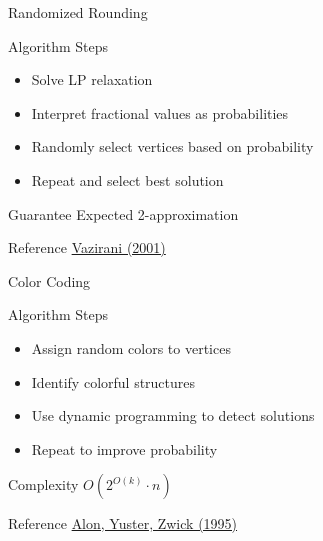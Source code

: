 \documentclass[aspectratio=169]{beamer}
\begin{document}
\begin{frame}{Randomized Rounding}

\begin{block}{Algorithm Steps}
\begin{itemize}
\item Solve LP relaxation
\item Interpret fractional values as probabilities
\item Randomly select vertices based on probability
\item Repeat and select best solution
\end{itemize}
\end{block}

\begin{exampleblock}{Guarantee}
Expected 2-approximation
\end{exampleblock}

\begin{alertblock}{Reference}
\href{https://doi.org/10.1007/978-3-662-04565-7}{Vazirani (2001)}
\end{alertblock}

\end{frame}

\begin{frame}{Color Coding}

\begin{block}{Algorithm Steps}
\begin{itemize}
\item Assign random colors to vertices
\item Identify colorful structures
\item Use dynamic programming to detect solutions
\item Repeat to improve probability
\end{itemize}
\end{block}

\begin{exampleblock}{Complexity}
$O(2^{O(k)} \cdot n)$
\end{exampleblock}

\begin{alertblock}{Reference}
\href{https://doi.org/10.1145/210332.210337}{Alon, Yuster, Zwick (1995)}
\end{alertblock}

\end{frame}

\end{document}
